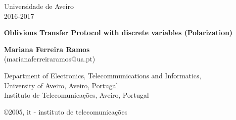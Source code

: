 \documentclass[5pt]{article}
\newcommand{\br}[1]{{\textbf{\color{itred} #1}}}%
\begin{document}
\begin{titlepage}  

\color{itblue} \sffamily \noindent \small
\hspace*{1cm}  Universidade de Aveiro\\ %
\hspace*{1cm}  2016-2017\\ %

\vspace*{1cm}
\begin{center}
    \color{black} \sffamily \noindent \Large
    \br{Oblivious Transfer Protocol with discrete variables (Polarization)\\}
\end{center}
\vspace{6mm}
\begin{center}
    \color{black}
    \textbf{Mariana Ferreira Ramos\\}
    {(marianaferreiraramos@ua.pt)}
\end{center}

\vspace{0.0mm}
\scriptsize
\begin{center}
Department of Electronics, Telecommunications and Informatics,\\
University of Aveiro, Aveiro, Portugal\\
Instituto de Telecomunica\c{c}\~{o}es, Aveiro, Portugal\\
\end{center}

\vspace{1.0cm}
\hspace*{13.2cm}\tiny \copyright 2005, it - instituto de telecomunica\c{c}\~{o}es\hfill

\end{titlepage}


\renewcommand{\headsep}{-25pt}

\end{document}
